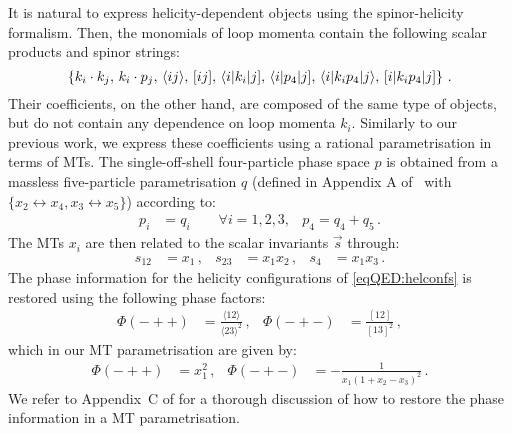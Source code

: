 \documentclass[main.tex]{subfiles}
\begin{document}
It is natural to express helicity-dependent objects using the spinor-helicity formalism. Then, the monomials of loop momenta contain the following scalar products and spinor strings:
\begin{equation} \label{eqQED:loopmomobjects}
	\left\{ k_i \cdot k_j, \,
    k_i \cdot p_j ,\,
    \langle ij \rangle,\,
    [ ij ],\,
    \langle i |k_i |j],\,
    \langle i |p_4 |j],\,
    \langle i|k_i p_4|j \rangle,\,
    [i| k_i p_4 |j] \right\} \,.
\end{equation}
Their coefficients, on the other hand, are composed of the same type of
objects, but do not contain any dependence on loop momenta $k_i$.  Similarly to our previous work, we express these coefficients using a rational parametrisation in terms of MTs. The single-off-shell four-particle phase space $p$ is obtained from a massless five-particle parametrisation $q$ (defined in Appendix A of~ with $\{x_2\leftrightarrow x_4,x_3\leftrightarrow x_5\}$) according to:
\begin{align}
    p_i &= q_i \qquad \forall i=1,2,3, & p_4=q_4+q_5 \, .
\end{align}
The MTs $x_i$ are then related to the scalar invariants $\vec{s}$ through:
\begin{align} \label{eqQED:mtvs}
    s_{12} &= x_1 \,, &
    s_{23} &= x_1 x_2 \,, &
    s_4 &= x_1 x_3 \,.
\end{align}
The phase information for the helicity configurations of \cref{eqQED:helconfs} is restored using the following phase factors: 
\begin{align}
  \Phi(-++) &= \frac{\langle 1 2 \rangle}{\langle 2 3 \rangle^2} \,,&
  \Phi(-+-) &= \frac{[ 1 2 ]}{[ 1 3 ]^2} \,,
\end{align}
which in our MT parametrisation are given by:
\begin{align}
  \Phi(-++) &= x_1^2 \,,&
  \Phi(-+-) &= - \frac{1}{x_1 (1 + x_2 - x_3)^2}   \,.
\end{align}
We refer to Appendix~C of  for a thorough discussion of how to restore the phase information in a MT parametrisation.
  
\end{document}
